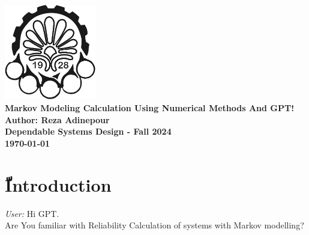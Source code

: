\documentclass[a4paper,12pt]{article}
\begin{document}
	
	\begin{titlepage}
		\centering
		\vspace*{1in}
		\includegraphics[width=0.3\textwidth]{Images/AUT_logo.png}\\[1in] %
		\textbf{\Huge Markov Modeling Calculation Using Numerical Methods And GPT!}\\[0.5in]
		\textbf{\large \color{teal}Author: Reza Adinepour}\\[0.5in]
		\textbf{\large Dependable Systems Design - Fall 2024}\\[1in]
		\textbf{\large \color{gray}\today}
	\end{titlepage}
	
	\newpage
	\tableofcontents
	\newpage
	
	\section{ّIntroduction}
	\begin{questionbox}
		\textit{User:} Hi GPT. \\
		Are You familiar with Reliability Calculation of systems with Markov modelling?
	\end{questionbox}
	
\end{document}
